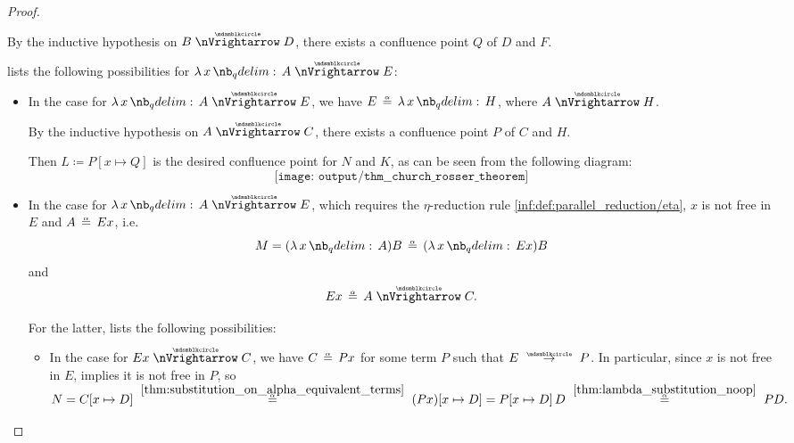 \begin{proof}
\begin{itemize}
\begin{itemize}
      By the inductive hypothesis on \( B \ppred D \), there exists a confluence point \( Q \) of \( D \) and \( F \).

       lists the following possibilities for \( \qabs x A \ppred E \):
      \begin{itemize}
        \item In the case  for \( \qabs x A \ppred E \), we have \( E \aequiv \qabs x H \), where \( A \ppred H \).

        By the inductive hypothesis on \( A \ppred C \), there exists a confluence point \( P \) of \( C \) and \( H \).

        Then \( L \coloneqq P[x \mapsto Q] \) is the desired confluence point for \( N \) and \( K \), as can be seen from the following diagram:
        \begin{equation*}
          \texttt{[image: output/thm\_\_church\_rosser\_theorem]}
        \end{equation*}

        \item In the case  for \( \qabs x A \ppred E \), which requires the \( \eta \)-reduction rule \ref{inf:def:parallel_reduction/eta}, \( x \) is not free in \( E \) and \( A \aequiv Ex \), i.e.
        \begin{equation*}
          M = (\qabs x A) B \aequiv (\qabs x E x) B
        \end{equation*}
        and
        \begin{equation*}
          Ex \aequiv A \ppred C.
        \end{equation*}

        For the latter,  lists the following possibilities:
        \begin{itemize}
          \item In the case  for \( Ex \ppred C \), we have \( C \aequiv Px \) for some term \( P \) such that \( E \pred P \). In particular, since \( x \) is not free in \( E \),  implies it is not free in \( P \), so
          \begin{equation*}
            N
            =
            C[x \mapsto D]
            \reloset {\ref{thm:substitution_on_alpha_equivalent_terms}} \aequiv
            (Px)[x \mapsto D]
            =
            P[x \mapsto D] \thinspace D
            \reloset {\ref{thm:lambda_substitution_noop}} \aequiv
            PD.
          \end{equation*}


\end{itemize}
\end{itemize}
\end{itemize}
\end{itemize}
\end{proof}
